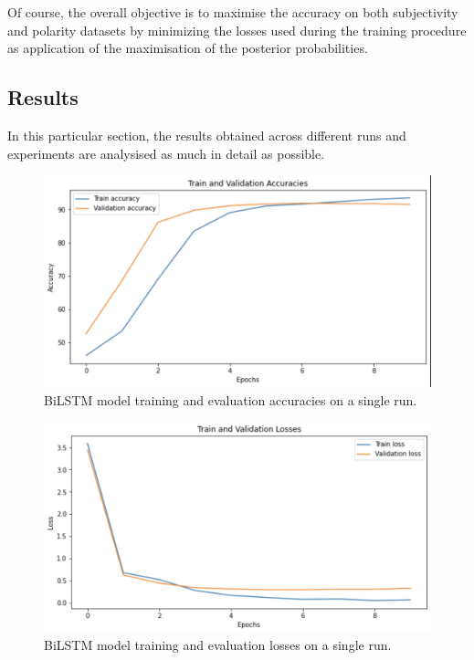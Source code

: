Of course, the overall objective is to maximise the accuracy on both subjectivity and polarity datasets by minimizing the losses used during 
the training procedure as application of the maximisation of the posterior probabilities.

\subsection{Results}
\label{subsec:res}
In this particular section, the results obtained across different runs and experiments are analysised as much in detail as possible.\\
\begin{figure}
    \centering
    \includegraphics[scale=0.28]{Images/singlerunacc.png}
    \vspace{-1.0em}
    \caption{BiLSTM model training and evaluation accuracies on a single run.}
    \vspace{-1.0em}
    \label{fig:singlerunacc}
\end{figure}

\begin{figure}
    \centering
    \includegraphics[scale=0.28]{Images/singlerunloss.png}
    \vspace{-1.0em}
    \caption{BiLSTM model training and evaluation losses on a single run.}
    \vspace{-1.0em}
    \label{fig:singlerunloss}
\end{figure}


